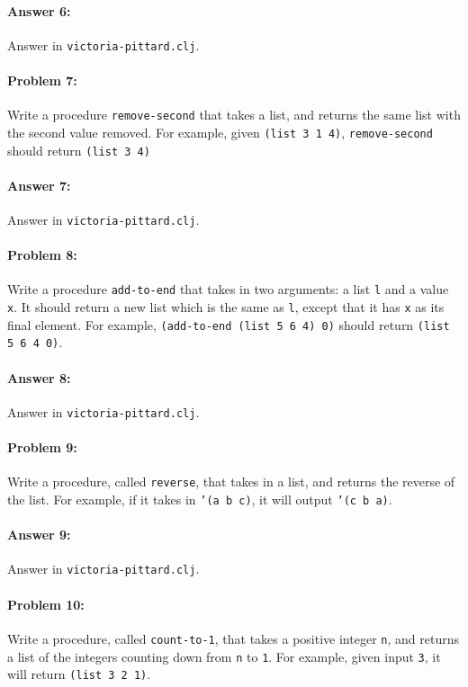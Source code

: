 \documentclass[10pt]{article}
\begin{document}
\paragraph{Answer 6:} Answer in \texttt{victoria-pittard.clj}.

\hrulefill
\paragraph{Problem 7:}
Write a procedure \texttt{remove-second} that takes a list, and
returns the same list with the second value removed. For example,
given \texttt{(list 3 1 4)}, \texttt{remove-second} should return
\texttt{(list 3 4)}

\paragraph{Answer 7:} Answer in \texttt{victoria-pittard.clj}.

\hrulefill
\paragraph{Problem 8:}
  Write a procedure \texttt{add-to-end} that takes in two arguments: a
  list \texttt{l} and a value \texttt{x}. It should return a new list
  which is the same as \texttt{l}, except that it has \texttt{x} as
  its final element. For example, \texttt{(add-to-end (list 5 6 4) 0)}
  should return \texttt{(list 5 6 4 0)}.

\paragraph{Answer 8:} Answer in \texttt{victoria-pittard.clj}.

\hrulefill
\paragraph{Problem 9:}
  Write a procedure, called \texttt{reverse}, that takes in a list, and returns
  the reverse of the list. For example, if it takes in \texttt{'(a b c)}, it
  will output \texttt{'(c b a)}.

\paragraph{Answer 9:} Answer in \texttt{victoria-pittard.clj}.

\hrulefill
\paragraph{Problem 10:}
  Write a procedure, called \texttt{count-to-1}, that takes a positive
  integer \texttt{n}, and returns a list of the integers counting down
  from \texttt{n} to \texttt{1}. For example, given input \texttt{3},
  it will return \texttt{(list 3 2 1)}.
\end{document}
